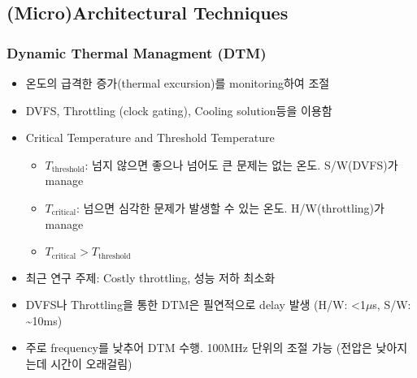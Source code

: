 \subsection{(Micro)Architectural Techniques}

\subsubsection*{Dynamic Thermal Managment (DTM)}
\begin{itemize}
    \item 온도의 급격한 증가(thermal excursion)를 monitoring하여 조절
    \item DVFS, Throttling (clock gating), Cooling solution등을 이용함
    \item Critical Temperature and Threshold Temperature
    \begin{itemize}
        \item $T_{\mathrm{threshold}}$: 넘지 않으면 좋으나 넘어도 큰 문제는 없는 온도. S/W(DVFS)가 manage
        \item $T_{\mathrm{critical}}$: 넘으면 심각한 문제가 발생할 수 있는 온도. H/W(throttling)가 manage
        \item $T_{\mathrm{critical}} > T_{\mathrm{threshold}}$
    \end{itemize}
    \item 최근 연구 주제: Costly throttling, 성능 저하 최소화
    \item DVFS나 Throttling을 통한 DTM은 필연적으로 delay 발생 (H/W: \textless 1$\mu$s, S/W: \textasciitilde 10ms)
    \item 주로 frequency를 낮추어 DTM 수행. 100MHz 단위의 조절 가능 (전압은 낮아지는데 시간이 오래걸림)
\end{itemize}

